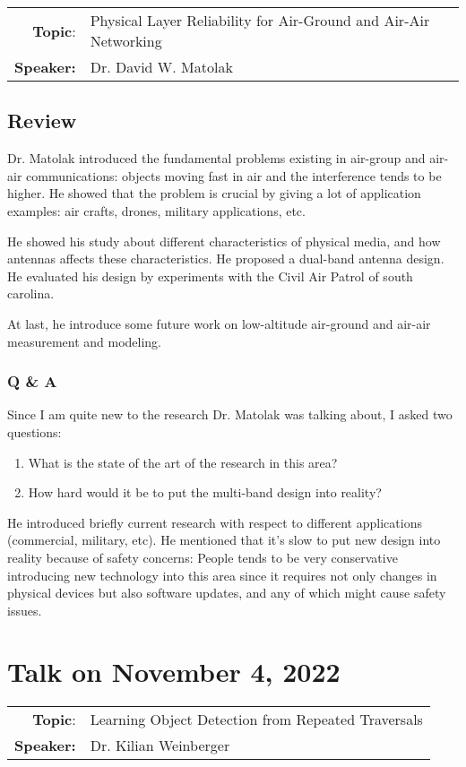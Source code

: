 \documentclass[11pt, oneside]{article}   	%
\begin{document}
\begin{tabularx} {\textwidth}{r X}
\textbf{Topic}: & Physical Layer Reliability for Air-Ground and Air-Air Networking\\
\textbf{Speaker:} & Dr. David W. Matolak\\
\end{tabularx}

\subsection{Review}
Dr. Matolak introduced the fundamental problems existing in air-group and air-air communications: objects moving fast in air and the interference tends to be higher. He showed that the problem is crucial by giving a lot of application examples: air crafts, drones, military applications, etc. 

He showed his study about different characteristics of physical media, and how antennas affects these characteristics. He proposed a dual-band antenna design. He evaluated his design by experiments with the Civil Air Patrol of south carolina.

At last, he introduce some future work on low-altitude air-ground and air-air measurement and modeling.

\subsubsection{Q \& A}
Since I am quite new to the research Dr. Matolak was talking about, I asked two questions: 
\begin{enumerate}
\item What is the state of the art of the research in this area?
\item How hard would it be to put the multi-band design into reality?
\end{enumerate}

He introduced briefly current research with respect to different applications (commercial, military, etc). He mentioned that it's slow to put new design into reality because of safety concerns: People tends to be very conservative introducing new technology into this area since it requires not only changes in physical devices but also software updates, and any of which might cause safety issues.

\newpage
\section{Talk on November 4, 2022}
\begin{tabularx} {\textwidth}{r X}
\textbf{Topic}: & Learning Object Detection from Repeated Traversals\\
\textbf{Speaker:} & Dr. Kilian Weinberger\\
\end{tabularx}
\end{document}
